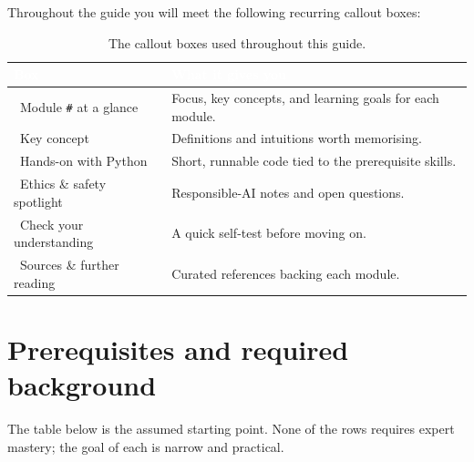 \documentclass[11pt,a4paper]{article}
\begin{document}
	Throughout the guide you will meet the following recurring callout boxes:
	
	\begin{table}[ht]
		\centering
		\small\sffamily
		\renewcommand{\arraystretch}{1.3}
		\begin{tabular}{@{}L{5.2cm} L{9.6cm}@{}}
			\toprule
			\textcolor{white}{\textbf{Box}} & \textcolor{white}{\textbf{What it gives you}} \\
			\midrule
			\textcolor{primary}{\faInfoCircle}\ Module \verb*|#| at a glance & Focus, key concepts, and learning goals for each module. \\
			\textcolor{primary}{\faLightbulb}\ Key concept & Definitions and intuitions worth memorising. \\
			\textcolor{secondary}{\faPython}\ Hands-on with Python & Short, runnable code tied to the prerequisite skills. \\
			\textcolor{accent}{\faBalanceScale}\ Ethics \& safety spotlight & Responsible-AI notes and open questions. \\
			\textcolor{dpurple}{\faQuestionCircle}\ Check your understanding & A quick self-test before moving on. \\
			\textcolor{textgray}{\faBookOpen}\ Sources \& further reading & Curated references backing each module. \\
			\bottomrule
		\end{tabular}
		\caption{The callout boxes used throughout this guide.}
	\end{table}
	
	\section*{Prerequisites and required background}
	
	The table below is the assumed starting point. None of the rows
	requires expert mastery; the goal of each is narrow and practical.
	
\end{document}
